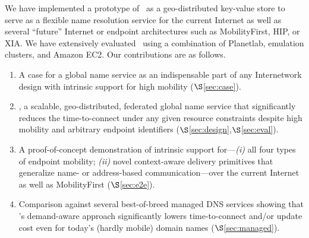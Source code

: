 


We have implemented a prototype of \auspice\ as a geo-distributed key-value store to serve as a flexible name resolution service for the current Internet as well as several ``future'' Internet or endpoint architectures such as MobilityFirst\cite{MobilityFirst}, HIP\cite{HIP}, or XIA\cite{XIA}. We have extensively evaluated \auspice\  using a combination of Planetlab, emulation clusters, and Amazon EC2.  Our contributions are as follows.
\begin{enumerate}
\item A case for a global name service as an indispensable part of any Internetwork design with intrinsic support for high mobility ($\S$\ref{sec:case}).

\item \auspice, a scalable, geo-distributed, federated global name service that significantly reduces the time-to-connect under any given resource constraints despite high mobility and arbitrary endpoint identifiers ($\S$\ref{sec:design},$\S$\ref{sec:eval}). 

\item A proof-of-concept demonstration of intrinsic support for---{\em(i)} all four types of endpoint mobility; {\em(ii)} novel context-aware delivery primitives that generalize name- or address-based communication---over the current Internet as well as MobilityFirst \cite{MobilityFirst} ($\S$\ref{sec:e2e}). 

\item Comparison against several best-of-breed managed DNS services showing that \auspice's  demand-aware approach significantly lowers time-to-connect and/or update cost even for today's (hardly mobile) domain names ($\S$\ref{sec:managed}).

\end{enumerate}


